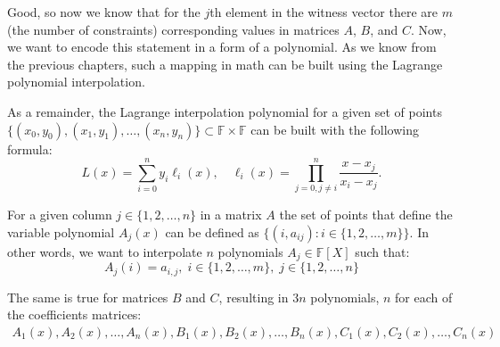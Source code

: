 \documentclass[../lecture-notes.tex]{subfiles}
\begin{document}
\begin{example}
\begin{center}
    \end{center}
\end{example}

Good, so now we know that for the $j$th element in the witness vector there are $m$ (the number of constraints) corresponding values in matrices $A$, $B$, and $C$. Now, we want to encode this statement in a form of a polynomial. 
As we know from the previous chapters, such a mapping in math can be built using the Lagrange polynomial interpolation.

\begin{remark}
    As a remainder, the Lagrange interpolation polynomial for a given set of points 
    $\{(x_0,y_0),(x_1,y_1),\dots,(x_n,y_n)\} \subset \mathbb{F} \times \mathbb{F}$
    can be built with the following formula:
    \begin{equation*}
        L(x) = \sum_{i=0}^{n} y_i \ell_i(x), \quad \ell_i(x) = \prod_{j=0, j \neq i}^{n} \frac{x-x_j}{x_i-x_j}.
    \end{equation*}  
\end{remark}

For a given column $j \in \{1, 2, \dots, n\}$ in a matrix $A$ the set of points that define the
variable polynomial $A_j(x)$ can be defined as $\{(i, a_{ij}): i \in \{1, 2, \dots, m\}\}$. In other words,
we want to interpolate $n$ polynomials $A_j \in \mathbb{F}[X]$ such that:
\begin{equation*}
    A_j(i) = a_{i,j}, \; i \in \{1,2,\dots,m\}, \; j \in \{1,2,\dots,n\}
\end{equation*}

The same is true for matrices $B$ and $C$, resulting in $3n$ polynomials, $n$ for each of the
coefficients matrices:
\begin{align*}
    A_1(x), A_2(x), \dots, A_n(x), 
    B_1(x), B_2(x), \dots, B_n(x),
    C_1(x), C_2(x), \dots, C_n(x)
\end{align*}
\end{document}

